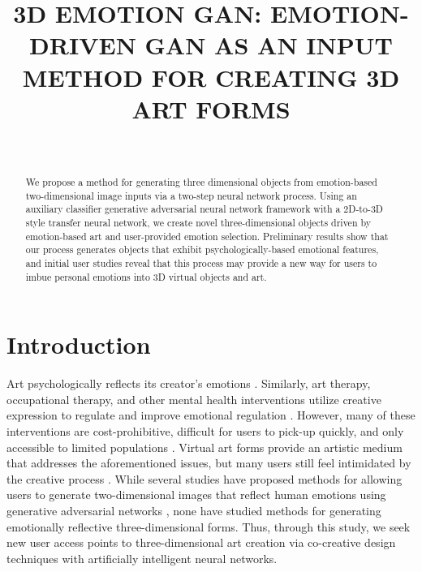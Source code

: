 \documentclass{sigchi}
\begin{document}
\title{3D EMOTION GAN: EMOTION-DRIVEN GAN AS AN INPUT METHOD FOR CREATING 3D ART FORMS}

\author{%
  \\
}

\maketitle

\begin{abstract}
We propose a method for generating three dimensional objects from emotion-based two-dimensional image inputs via a two-step neural network process. Using an auxiliary classifier generative adversarial neural network framework with a 2D-to-3D style transfer neural network, we create novel three-dimensional objects driven by emotion-based art and user-provided emotion selection. Preliminary results show that our process generates objects that exhibit psychologically-based emotional features, and initial user studies reveal that this process may provide a new way for users to imbue personal emotions into 3D virtual objects and art.
\end{abstract}


\section{Introduction}

Art psychologically reflects its creator’s emotions \cite{AlvarezMelis2017TheEG}. Similarly, art therapy, occupational therapy, and other mental health interventions utilize creative expression to regulate and improve emotional regulation \cite{article}. However, many of these interventions are cost-prohibitive, difficult for users to pick-up quickly, and only accessible to limited populations \cite{article}. Virtual art forms provide an artistic medium that addresses the aforementioned issues, but many users still feel intimidated by the creative process \cite{article}. While several studies have proposed methods for allowing users to generate two-dimensional images that reflect human emotions using generative adversarial networks \cite{AlvarezMelis2017TheEG}, none have studied methods for generating emotionally reflective three-dimensional forms. Thus, through this study, we seek new user access points to three-dimensional art creation via co-creative design techniques with artificially intelligent neural networks.
\end{document}
